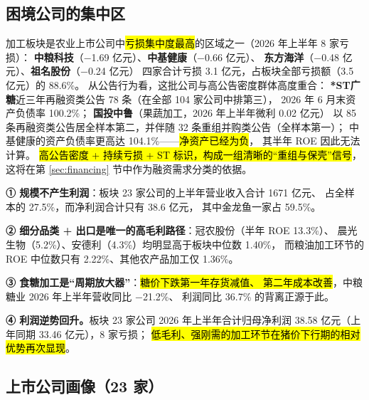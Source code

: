 \subsection{困境公司的集中区}
\label{sec:processing-distress}

加工板块是农业上市公司中\hl{亏损集中度最高}的区域之一（2026 年上半年 \num{8} 家亏损）：
\textbf{中粮科技}（\num{-1.69} 亿元）、\textbf{中基健康}（\num{-0.66} 亿元）、
\textbf{东方海洋}（\num{-0.48} 亿元）、\textbf{祖名股份}（\num{-0.24} 亿元）
四家合计亏损 \num{3.1} 亿元，占板块全部亏损额（\num{3.5} 亿元）的 \num{88.6}\%。
从公告行为看，这批公司与高公告密度群体高度重合：
\textbf{*ST广糖}近三年再融资类公告 \num{78} 条（在全部 \num{104} 家公司中排第三），
2026 年 6 月末资产负债率 \num{100.2}\%；
\textbf{国投中鲁}（果蔬加工，2026 年上半年微利 \num{0.02} 亿元）
以 \num{85} 条再融资类公告居全样本第二，并伴随 \num{32} 条重组并购类公告（全样本第一）；
中基健康的资产负债率更高达 \num{104.1}\%——\hl{净资产已经为负}，
其半年 ROE 因此无法计算。
\hl{高公告密度 + 持续亏损 + ST 标识，构成一组清晰的“重组与保壳”信号}，
这将在第 \ref{sec:financing} 节中作为融资需求分类的依据。

\begin{keybox}[农产品加工的画像结论]
\normalsize
\textbf{① 规模不产生利润}：板块 \num{23} 家公司的上半年营业收入合计 \num{1671} 亿元、
占全样本的 \num{27.5}\%，而净利润合计只有 \num{38.6} 亿元，
其中金龙鱼一家占 \num{59.5}\%。\par\vspace{3pt}
\textbf{② 细分品类 + 出口是唯一的高毛利路径}：冠农股份（半年 ROE \num{13.3}\%）、
晨光生物（\num{5.2}\%）、安德利（\num{4.3}\%）均明显高于板块中位数 \num{1.40}\%，
而粮油加工环节的 ROE 中位数只有 \num{2.22}\%、其他农产品加工仅 \num{1.36}\%。\par\vspace{3pt}
\textbf{③ 食糖加工是“周期放大器”}：\hl{糖价下跌第一年存货减值、
第二年成本改善}，中粮糖业 2026 年上半年营收同比 \num{-21.2}\%、
利润同比 \num{+36.7}\% 的背离正源于此。\par\vspace{3pt}
\textbf{④ 利润逆势回升。}板块 \num{23} 家公司 2026 年上半年合计归母净利润
\num{38.58} 亿元（上年同期 \num{33.46} 亿元），\num{8} 家亏损；
\hl{低毛利、强刚需的加工环节在猪价下行期的相对优势再次显现}。
\end{keybox}

\subsection{上市公司画像（\num{23} 家）}
\label{sec:co-processing}

